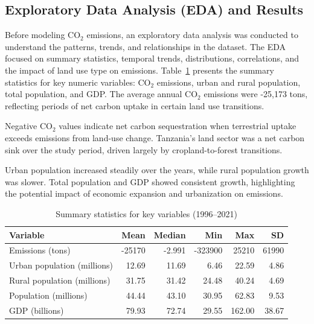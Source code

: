 \documentclass[10pt,letterpaper]{article}
\begin{document}
\subsection{Exploratory Data Analysis (EDA) and Results}

Before modeling CO$_2$ emissions, an exploratory data analysis was conducted to understand the patterns, trends, and relationships in the dataset. The EDA focused on summary statistics, temporal trends, distributions, correlations, and the impact of land use type on emissions. Table~\ref{tab:summary_stats} presents the summary statistics for key numeric variables: CO$_2$ emissions, urban and rural population, total population, and GDP. The average annual CO$_2$ emissions were -25,173 tons, reflecting periods of net carbon uptake in certain land use transitions.

Negative CO$_2$ values indicate net carbon sequestration when terrestrial uptake exceeds emissions from land-use change. Tanzania’s land sector was a net carbon sink over the study period, driven largely by cropland-to-forest transitions.


Urban population increased steadily over the years, while rural population growth was slower. Total population and GDP showed consistent growth, highlighting the potential impact of economic expansion and urbanization on emissions.



\begin{table}[h!]
	\centering
	\caption{Summary statistics for key variables (1996--2021)}
	\label{tab:summary_stats}
	\begin{tabular}{lrrrrr}
		\hline
		Variable & Mean & Median & Min & Max & SD \\
		\hline
		Emissions (tons) & -25170 & -2.991 & -323900 & 25210 & 61990 \\
		Urban population (millions) & 12.69 & 11.69 & 6.46 & 22.59 & 4.86 \\
		Rural population (millions) & 31.75 & 31.42 & 24.48 & 40.24 & 4.69 \\
		Population (millions) & 44.44 & 43.10 & 30.95 & 62.83 & 9.53 \\
		GDP (billions) & 79.93 & 72.74 & 29.55 & 162.00 & 38.67 \\
		\hline
	\end{tabular}
\end{table}
\end{document}
